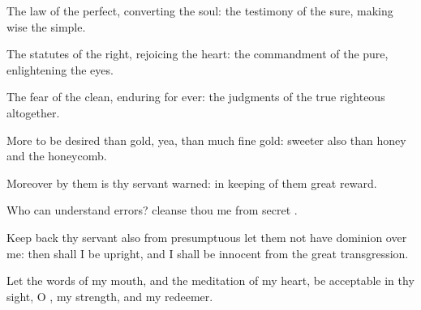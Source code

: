 {\Q {}The
law of the
{}
{}
perfect,
converting the
soul: the
testimony of the
{}
{}
sure, making
wise the
simple.


\par }{\Q {}The
statutes of the
{}
{}
right,
rejoicing the
heart: the
commandment of the
{}
{}
pure,
enlightening the
eyes.


\par }{\Q {}The
fear of the
{}
{}
clean,
enduring for
ever: the
judgments of the
{}
{}
true
{}
righteous
altogether.


\par }{\Q {}More to be
desired
{} than
gold, yea, than
much fine
gold:
sweeter also than
honey and the
honeycomb.


\par }{\Q {}Moreover by them is thy
servant
warned:
{} in
keeping of them
{}
great
reward.


\par }{\Q {}Who can
understand
{}
errors?
cleanse thou me from
secret
{}.


\par }{\Q {}Keep
back thy
servant also from
presumptuous
{} let them not have
dominion over me: then shall I be
upright, and I shall be
innocent from the
great
transgression.


\par }{\Q {}Let the
words of my
mouth, and the
meditation of my
heart, be
acceptable in thy
sight, O
{}, my
strength, and my
redeemer.




\par }

